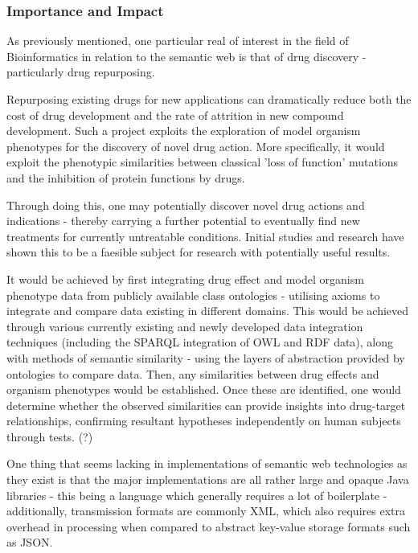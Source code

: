 \documentclass{article}
\begin{document}
\subsubsection{Importance and Impact}


As previously mentioned, one particular real of interest in the field of
Bioinformatics in relation to the semantic web is that of drug discovery -
particularly drug repurposing\cite{pharmgkb}.

Repurposing existing drugs for new applications can dramatically reduce both
the cost of drug development and the rate of attrition in new compound
development. Such a project exploits the exploration of model organism
phenotypes for the discovery of novel drug action. More specifically, it would
exploit the phenotypic similarities between classical 'loss of function'
mutations and the inhibition of protein functions by drugs.

Through doing this, one may potentially discover novel drug actions and
indications - thereby carrying a further potential to eventually find new treatments for
currently untreatable conditions. Initial studies and research have shown this
to be a faesible subject for research with potentially useful
results.\cite{drugrepurposeinitial}

It would be achieved by first integrating drug effect and model organism
phenotype data from publicly available class ontologies - utilising axioms to
integrate and compare data existing in different domains. This would be achieved
through various currently existing and  newly developed data integration techniques 
(including the SPARQL integration of OWL and RDF data), along with methods of
semantic similarity - using the layers of abstraction provided by ontologies
to compare data. Then, any similarities between drug effects and organism
phenotypes would be established. Once these are identified, one would determine 
whether the observed similarities can provide insights into drug-target relationships, 
confirming resultant hypotheses independently on human subjects through tests.
(?)


One thing that seems lacking in implementations of semantic web technologies as
they exist is that the major implementations are all rather large and opaque
Java libraries - this being a language which generally requires a lot of
boilerplate - additionally, transmission formats are commonly XML, which also
requires extra overhead in processing when compared to abstract key-value
storage formats such as JSON. 
\end{document}
